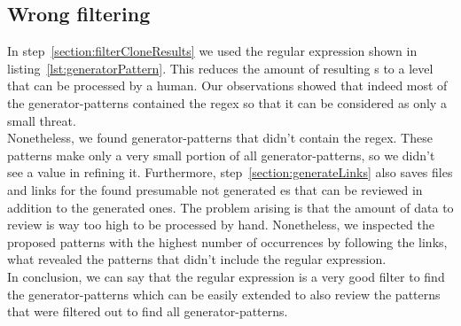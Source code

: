 \subsection{Wrong filtering}
In step~\ref{section:filterCloneResults} we used the regular expression shown in listing~\ref{lst:generatorPattern}. This reduces the amount of resulting s to a level that can be processed by a human. Our observations showed that indeed most of the generator-patterns contained the regex so that it can be considered as only a small threat.\\
Nonetheless, we found generator-patterns that didn't contain the regex. These patterns make only a very small portion of all generator-patterns, so we didn't see a value in refining it. Furthermore, step~\ref{section:generateLinks} also saves files and links for the found presumable not generated es that can be reviewed in addition to the generated ones. The problem arising is that the amount of data to review is way too high to be processed by hand. Nonetheless, we inspected the proposed patterns with the highest number of occurrences by following the links, what revealed the patterns that didn't include the regular expression.\\
In conclusion, we can say that the regular expression is a very good filter to find the generator-patterns which can be easily extended to also review the patterns that were filtered out to find all generator-patterns.

